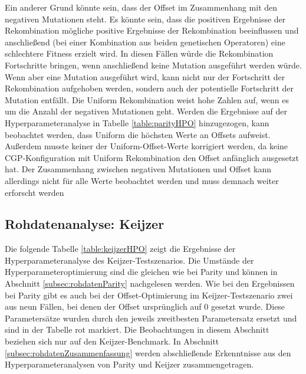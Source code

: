 Ein anderer Grund könnte sein, dass der Offset im Zusammenhang mit den negativen Mutationen steht.
Es könnte sein, dass die positiven Ergebnisse der Rekombination mögliche positive Ergebnisse der Rekombination beeinflussen und anschließend (bei einer Kombination aus beiden genetischen Operatoren) eine schlechtere Fitness erzielt wird.
In diesen Fällen würde die Rekombination Fortschritte bringen, wenn anschließend keine Mutation ausgeführt werden würde.
Wenn aber eine Mutation ausgeführt wird, kann nicht nur der Fortschritt der Rekombination aufgehoben werden, sondern auch der potentielle Fortschritt der Mutation entfällt.
Die Uniform Rekombination weist hohe Zahlen auf, wenn es um die Anzahl der negativen Mutationen geht. 
Werden die Ergebnisse auf der Hyperparameteranalyse in Tabelle \ref{table:parityHPO} hinzugezogen, kann beobachtet werden, dass Uniform die höchsten Werte an Offsets aufweist.
Außerdem musste keiner der Uniform-Offset-Werte korrigiert werden, da keine CGP-Konfiguration mit Uniform Rekombination den Offset anfänglich ausgesetzt hat.
Der Zusammenhang zwischen negativen Mutationen und Offset kann allerdings nicht für alle Werte beobachtet werden und muss demnach weiter erforscht werden

\subsection{Rohdatenanalyse: Keijzer}
\label{subsec:rohdatenKeijzer}

Die folgende Tabelle \ref{table:keijzerHPO} zeigt die Ergebnisse der Hyperparameteranalyse des Keijzer-Test\-sze\-narios.
Die Umstände der Hyperparameteroptimierung sind die gleichen wie bei Parity und können in Abschnitt \ref{subsec:rohdatenParity} nachgelesen werden.
Wie bei den Ergebnissen bei Parity gibt es auch bei der Offset-Optimierung im Keijzer-Testszenario zwei aus neun Fällen, bei denen der Offset ursprünglich auf 0 gesetzt wurde.
Diese Parametersätze wurden durch den jeweils zweitbesten Parametersatz ersetzt und sind in der Tabelle rot markiert.
Die Beobachtungen in diesem Abschnitt beziehen sich nur auf den Keijzer-Benchmark.
In Abschnitt \ref{subsec:rohdatenZusammenfassung} werden abschließende Erkenntnisse aus den Hyperparameteranalysen von Parity und Keijzer zusammengetragen.

